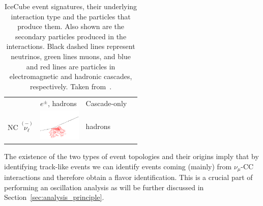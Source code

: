 \begin{table}[h]
\begin{center}
\begin{tabular}{  m{2.3cm} m{2.3cm} m{4.5cm} m{3.5cm}  }
            & $e^\pm$, hadrons & {Cascade-only}\\
            \cmidrule{1-3}
            NC $\overset{\scriptscriptstyle(-)}{\nu_\ell}$ 
            & \includegraphics[width=2cm]{figures/nuall_NC_cascadeonly.pdf} 
            & hadrons &  {} \\
            \hline
        \end{tabular}
    \end{center}
    \caption[Event signatures in IceCube and their underlying interactions, taken from~\cite{ATerliuk}]{IceCube event signatures, their underlying interaction type and the particles that produce them. Also shown are the secondary particles produced in the interactions. Black dashed lines represent neutrinos, green lines muons, and blue and red lines are particles in electromagnetic and hadronic cascades, respectively. Taken from~\cite{ATerliuk}.}
    \label{tab:interactions_vs_signatures}
\end{table}

The existence of the two types of event topologies and their origins imply that by identifying track-like events we can identify events coming (mainly) from $\nu_\mu$-CC interactions and therefore obtain a flavor identification.
This is a crucial part of performing an oscillation analysis as will be further discussed in Section~\ref{sec:analysis_principle}.
